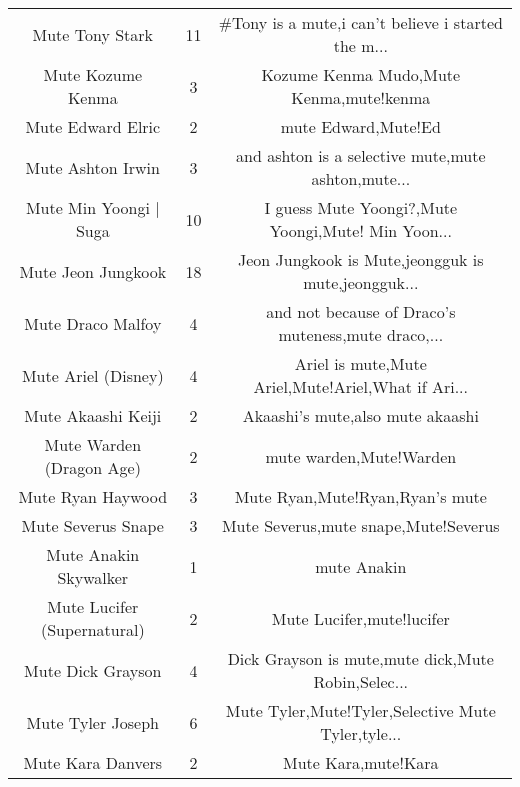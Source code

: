 \begin{table}[h!]
{\begin{tabular}{|c|c|c|}
                                   Mute Tony Stark &     11 & \#Tony is a mute,i can't believe i started the m... \\
                                 Mute Kozume Kenma &      3 &            Kozume Kenma Mudo,Mute Kenma,mute!kenma \\
                                 Mute Edward Elric &      2 &                                mute Edward,Mute!Ed \\
                                 Mute Ashton Irwin &      3 & and ashton is a selective mute,mute ashton,mute... \\
                            Mute Min Yoongi | Suga &     10 & I guess Mute Yoongi?,Mute Yoongi,Mute! Min Yoon... \\
                                Mute Jeon Jungkook &     18 & Jeon Jungkook is Mute,jeongguk is mute,jeongguk... \\
                                 Mute Draco Malfoy &      4 & and not because of Draco's muteness,mute draco,... \\
                               Mute Ariel (Disney) &      4 & Ariel is mute,Mute Ariel,Mute!Ariel,What if Ari... \\
                                Mute Akaashi Keiji &      2 &                   Akaashi's mute,also mute akaashi \\
                          Mute Warden (Dragon Age) &      2 &                            mute warden,Mute!Warden \\
                                 Mute Ryan Haywood &      3 &                    Mute Ryan,Mute!Ryan,Ryan's mute \\
                                Mute Severus Snape &      3 &               Mute Severus,mute snape,Mute!Severus \\
                             Mute Anakin Skywalker &      1 &                                        mute Anakin \\
                       Mute Lucifer (Supernatural) &      2 &                          Mute Lucifer,mute!lucifer \\
                                 Mute Dick Grayson &      4 & Dick Grayson is mute,mute dick,Mute Robin,Selec... \\
                                 Mute Tyler Joseph &      6 & Mute Tyler,Mute!Tyler,Selective Mute Tyler,tyle... \\
                                 Mute Kara Danvers &      2 &                                Mute Kara,mute!Kara \\

\end{tabular}}
\end{table}
